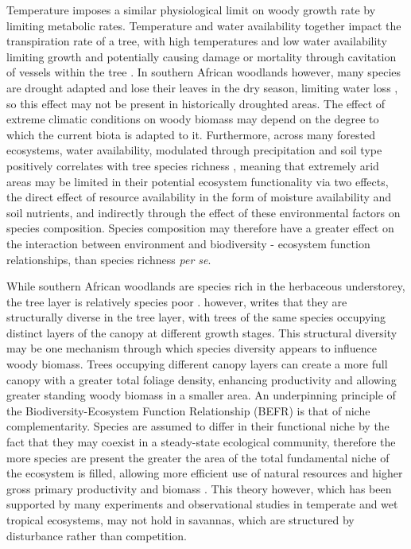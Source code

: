 \documentclass[11pt,a4paper]{article}
\begin{document}
Temperature imposes a similar physiological limit on woody growth rate by limiting metabolic rates. Temperature and water availability together impact the transpiration rate of a tree, with high temperatures and low water availability limiting growth and potentially causing damage or mortality through cavitation of vessels within the tree \citep{Rowland2015a, Fensham2009}. In southern African woodlands however, many species are drought adapted and lose their leaves in the dry season, limiting water loss \citep{Solbrig1996}, so this effect may not be present in historically droughted areas. The effect of extreme climatic conditions on woody biomass may depend on the degree to which the current biota is adapted to it. Furthermore, across many forested ecosystems, water availability, modulated through precipitation and soil type positively correlates with tree species richness \citep{Vila2005}, meaning that extremely arid areas may be limited in their potential ecosystem functionality via two effects, the direct effect of resource availability in the form of moisture availability and soil nutrients, and indirectly through the effect of these environmental factors on species composition. Species composition may therefore have a greater effect on the interaction between environment and biodiversity - ecosystem function relationships, than species richness \textit{per se}.




While southern African woodlands are species rich in the herbaceous understorey, the tree layer is relatively species poor \citep{}. \citet{Miombo-Book} however, writes that they are structurally diverse in the tree layer, with trees of the same species occupying distinct layers of the canopy at different growth stages. This structural diversity may be one mechanism through which species diversity appears to influence woody biomass. Trees occupying different canopy layers can create a more full canopy with a greater total foliage density, enhancing productivity and allowing greater standing woody biomass in a smaller area. An underpinning principle of the Biodiversity-Ecosystem Function Relationship (BEFR) is that of niche complementarity. Species are assumed to differ in their functional niche by the fact that they may coexist in a steady-state ecological community, therefore the more species are present the greater the area of the total fundamental niche of the ecosystem is filled, allowing more efficient use of natural resources and higher gross primary productivity and biomass \citep{}. This theory however, which has been supported by many experiments and observational studies in temperate and wet tropical ecosystems, may not hold in savannas, which are structured by disturbance rather than competition.
\end{document}
